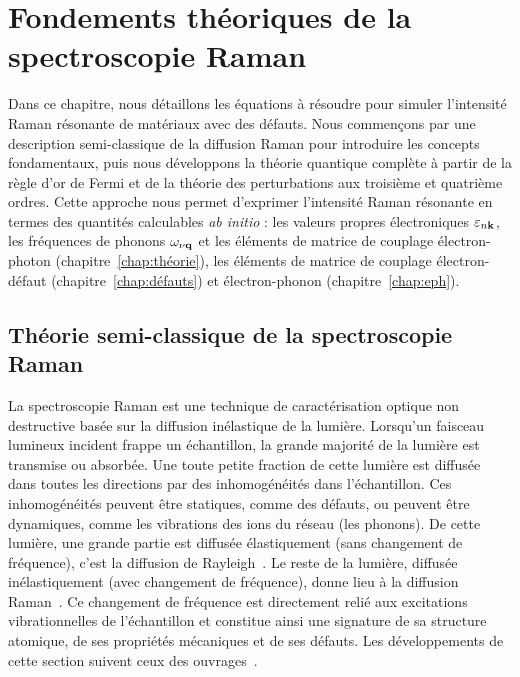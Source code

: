 \chapter{Fondements théoriques de la spectroscopie Raman}\label{chap:Raman}
Dans ce chapitre, nous détaillons les équations à résoudre pour simuler l'intensité Raman résonante de matériaux avec des défauts. Nous commençons par une description semi-classique de la diffusion Raman pour introduire les concepts fondamentaux, puis nous développons la théorie quantique complète à partir de la règle d'or de Fermi et de la théorie des perturbations aux troisième et quatrième ordres. Cette approche nous permet d'exprimer l'intensité Raman résonante en termes des quantités calculables \textit{ab initio} : les valeurs propres électroniques $\varepsilon_{n\mathbf{k}}$, les fréquences de phonons $\omega_{\nu\mathbf{q}}$ et les éléments de matrice de couplage électron-photon (chapitre~\ref{chap:théorie}), les éléments de matrice de couplage électron-défaut (chapitre~\ref{chap:défauts}) et électron-phonon (chapitre~\ref{chap:eph}).

\section{Théorie semi-classique de la spectroscopie Raman}\label{sec:raman_classique}
La spectroscopie Raman est une technique de caractérisation optique non destructive basée sur la diffusion inélastique de la lumière. Lorsqu'un faisceau lumineux incident frappe un échantillon, la grande majorité de la lumière est transmise ou absorbée. Une toute petite fraction de cette lumière est diffusée dans toutes les directions par des inhomogénéités dans l'échantillon. Ces inhomogénéités peuvent être statiques, comme des défauts, ou peuvent être dynamiques, comme les vibrations des ions du réseau (les phonons). De cette lumière, une grande partie est diffusée élastiquement (sans changement de fréquence), c'est la diffusion de Rayleigh~\cite{RayleighLightSky}. Le reste de la lumière, diffusée inélastiquement (avec changement de fréquence), donne lieu à la diffusion Raman~\cite{ramanNewTypeSecondary1928}. Ce changement de fréquence est directement relié aux excitations vibrationnelles de l'échantillon et constitue ainsi une signature de sa structure atomique, de ses propriétés mécaniques et de ses défauts. Les développements de cette section suivent ceux des ouvrages~\cite{yuFundamentalsSemiconductorsPhysics2010,cardonaLightScatteringSolids1982,cardonaLightScatteringSolids1983,SymmetrySpectroscopy}.

